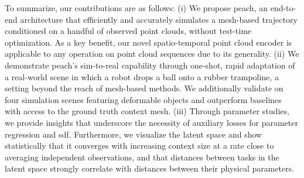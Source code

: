 

To summarize, our contributions are as follows:
(i) We propose \gls{peach}, an end-to-end architecture that efficiently and accurately simulates a mesh-based trajectory conditioned on a handful of observed point clouds, without test-time optimization.
As a  key benefit, our novel spatio-temporal point cloud encoder is applicable to any operation on point cloud sequences due to its generality.
(ii) We demonstrate \gls{peach}'s sim-to-real capability through one-shot, rapid adaptation of a real-world scene in which a robot drops a ball onto a rubber trampoline, a setting beyond the reach of mesh-based methods.
We additionally validate on four simulation scenes featuring deformable objects and outperform baselines with access to the ground truth context mesh.
(iii) Through parameter studies, we provide insights that underscore the necessity of auxiliary losses for parameter regression and \gls{sdf}.
Furthermore, we visualize the latent space and show statistically that it converges with increasing context size at a rate close to averaging independent observations, and that distances between tasks in the latent space strongly correlate with distances between their physical parameters.


